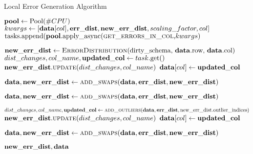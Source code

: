 \begin{algorithm}[!t]
    \caption{Local Error Generation Algorithm}\label{alg:local_generator}
    \begin{algorithmic}[1] 
	  
	  
	  \STATE $\mathbf{pool} \leftarrow \text{Pool}(\#CPU)$
	   {
	    \STATE $kwargs \leftarrow [\mathbf{data}[col], \mathbf{err\_dist}, \mathbf{new\_err\_dist}, scaling\_factor, col]$ 
        \STATE $\text{tasks.append(\ensuremath{\mathbf{pool}}.apply\_async(\textsc{get\_errors\_in\_col},} kwargs\text{)}$ 
      }\ENDFOR 
      
	  \STATE $\mathbf{new\_err\_dist} \leftarrow \text{\textsc{ErrorDistribution}(dirty\_schema, \ensuremath{\mathbf{data}}.row, \ensuremath{\mathbf{data}}.col)}$
	   {
        \STATE $dist\_changes, col\_name, \mathbf{updated\_col} \leftarrow task\text{.get()}$ 
        \STATE $\mathbf{new\_err\_dist}.\textsc{update}(dist\_changes, col\_name)$ 
        \STATE $\mathbf{data}[col] \leftarrow \mathbf{updated\_col}$ 
      }\ENDFOR 
      
      \STATE $\mathbf{data}, \mathbf{new\_err\_dist} \leftarrow \textsc{add\_swaps}(\mathbf{data}, \mathbf{err\_dist}, \mathbf{new\_err\_dist})$ 
      
      \STATE $\mathbf{data}, \mathbf{new\_err\_dist} \leftarrow \textsc{add\_swaps}(\mathbf{data}, \mathbf{err\_dist}, \mathbf{new\_err\_dist})$ 
      
       {
        \STATE $dist\_changes, col\_name, \mathbf{updated\_col} \leftarrow \textsc{add\_outliers}(\mathbf{data}, \mathbf{err\_dist}, \text{new\_err\_dist.outlier\_indices})$ 
        \STATE $\mathbf{new\_err\_dist}.\textsc{update}(dist\_changes, col\_name)$ 
        \STATE $\mathbf{data}[col] \leftarrow \mathbf{updated\_col}$ 
      }\ENDFOR 
      
      \STATE $\mathbf{data}, \mathbf{new\_err\_dist} \leftarrow \textsc{add\_swaps}(\mathbf{data}, \mathbf{err\_dist}, \mathbf{new\_err\_dist})$ 
      
      \RETURN $\mathbf{new\_err\_dist}, \mathbf{data}$
    \end{algorithmic}
\end{algorithm}


